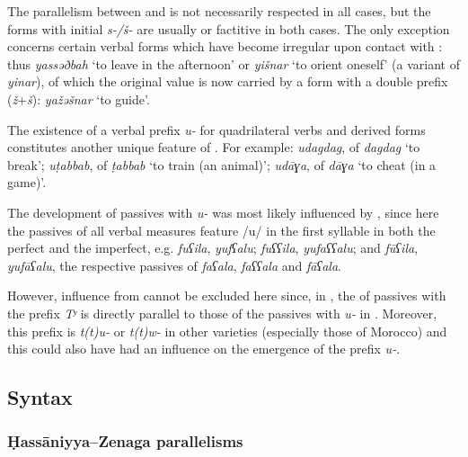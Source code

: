 \documentclass[output=paper]{langsci/langscibook}
\begin{document}
The parallelism between  and  is not necessarily respected in all cases, but the forms with initial \textit{s-/š-} are usually  or factitive in both cases. The only exception concerns certain  verbal forms which have become irregular upon contact with : thus \textit{yassəðbah} ‘to leave in the afternoon’ or \textit{yišnar} ‘to orient oneself’ (a variant of \textit{yinar}), of which the original  value is now carried by a form with a double prefix (\textit{ž}+\textit{š}): \textit{yažəšnar} ‘to guide’.


The existence of a  verbal prefix \textit{u-} for quadrilateral verbs and derived forms constitutes another unique feature of . For example: \textit{udagdag},  of \textit{dagdag} ‘to break’; \textit{uṭabbab},  of \textit{ṭabbab} ‘to train (an animal)’; \textit{udāɣa},  of \textit{dāɣa} ‘to cheat (in a game)’.

The development of passives with \textit{u-} was most likely influenced by  , since here the passives of all verbal measures feature /u/ in the first syllable in both the perfect and the imperfect, e.g. \textit{fuʕila}, \textit{yu}\textit{fʕalu}; \textit{fuʕʕila}, \textit{yu}\textit{faʕʕalu}; and \textit{fūʕila}, \textit{yu}\textit{fāʕalu}, the respective passives of \textit{faʕala}, \textit{faʕʕala} and \textit{fāʕala}.

However, influence from  cannot be excluded here since, in , the  of passives with the prefix \textit{Tʸ} is directly parallel to those of the passives with \textit{u-} in . Moreover, this prefix is \textit{t(t)u-} or \textit{t(t)w-} in other  varieties (especially those of Morocco) and this could also have had an influence on the emergence of the prefix \textit{u-}. 

\subsection{Syntax} %

\subsubsection{Ḥassāniyya–Zenaga parallelisms} %
\end{document}
